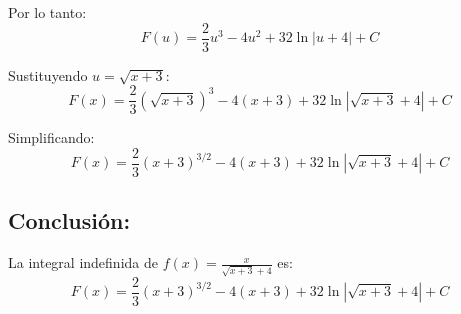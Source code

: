 \documentclass{article}
\begin{document}
\noindent Por lo tanto:
\[
F(u) = \frac{2}{3}u^3 - 4u^2 + 32 \ln|u+4| + C
\]

\noindent Sustituyendo \( u = \sqrt{x+3} \):
\[
F(x) = \frac{2}{3}(\sqrt{x+3})^3 - 4(x+3) + 32 \ln|\sqrt{x+3} + 4| + C
\]

\noindent Simplificando:
\[
F(x) = \frac{2}{3}(x+3)^{3/2} - 4(x+3) + 32 \ln|\sqrt{x+3} + 4| + C
\]

\subsection*{Conclusión:}

La integral indefinida de \( f(x) = \frac{x}{\sqrt{x+3} + 4} \) es:
\[
F(x) = \frac{2}{3}(x+3)^{3/2} - 4(x+3) + 32 \ln|\sqrt{x+3} + 4| + C
\]
\end{document}
